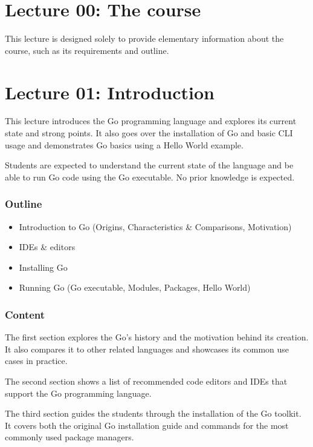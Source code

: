 \documentclass[
  digital,
  color,
  oneside,
  nosansbold,
  nocolorbold,
  nolof,
  nolot,
]{fithesis4}
\begin{document}
\section{Lecture 00: The course}

This lecture is designed solely to provide elementary information about the course, such as its requirements and outline.

\section{Lecture 01: Introduction}

This lecture introduces the Go programming language and explores its current state and strong points. It also goes over the installation of Go and basic CLI usage and demonstrates Go basics using a Hello World example.

Students are expected to understand the current state of the language and be able to run Go code using the Go executable. No prior knowledge is expected.

\subsubsection{Outline}

\begin{itemize}
    \item Introduction to Go (Origins, Characteristics \& Comparisons, Motivation)
    \item IDEs \& editors
    \item Installing Go
    \item Running Go (Go executable, Modules, Packages, Hello World)
\end{itemize}

\subsubsection{Content}

The first section explores the Go's history and the motivation behind its creation. It also compares it to other related languages and showcases its common use cases in practice.

The second section shows a list of recommended code editors and IDEs that support the Go programming language.

The third section guides the students through the installation of the Go toolkit. It covers both the original Go installation guide and commands for the most commonly used package managers.
\end{document}
